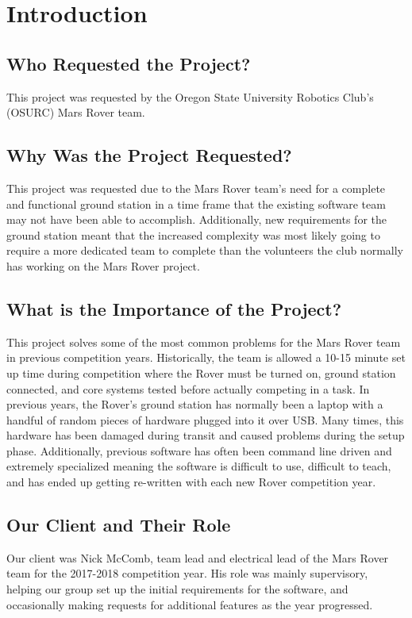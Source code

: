 \section{Introduction}
\subsection{Who Requested the Project?}
This project was requested by the Oregon State University Robotics Club's (OSURC) Mars Rover team.

\subsection{Why Was the Project Requested?}
This project was requested due to the Mars Rover team's need for a complete and functional ground station in a time frame that the existing software team may not have been able to accomplish. Additionally, new requirements for the ground station meant that the increased complexity was most likely going to require a more dedicated team to complete than the volunteers the club normally has working on the Mars Rover project.

\subsection{What is the Importance of the Project?}
This project solves some of the most common problems for the Mars Rover team in previous competition years. Historically, the team is allowed a 10-15 minute set up time during competition where the Rover must be turned on, ground station connected, and core systems tested before actually competing in a task. In previous years, the Rover's ground station has normally been a laptop with a handful of random pieces of hardware plugged into it over USB. Many times, this hardware has been damaged during transit and caused problems during the setup phase. Additionally, previous software has often been command line driven and extremely specialized meaning the software is difficult to use, difficult to teach, and has ended up getting re-written with each new Rover competition year.

\subsection{Our Client and Their Role}
Our client was Nick McComb, team lead and electrical lead of the Mars Rover team for the 2017-2018 competition year. His role was mainly supervisory, helping our group set up the initial requirements for the software, and occasionally making requests for additional features as the year progressed. 


